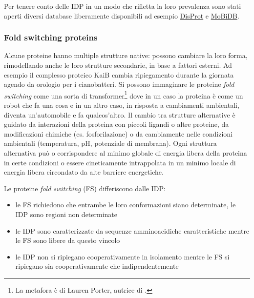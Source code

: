 {\par Per tenere conto delle IDP in un modo che rifletta la loro prevalenza sono stati aperti diversi database liberamente disponibili ad esempio \href{http://www.disprot.org}{DisProt} e \href{http://MoBiDB.bio.unipd.it}{MoBiDB}.

\subsubsection{Fold switching proteins} \label{sec:fold-switching-proteins}
{
Alcune proteine hanno multiple strutture native: possono cambiare la loro forma, rimodellando anche le loro strutture secondarie, in base a fattori esterni. Ad esempio il complesso proteico KaiB cambia ripiegamento durante la giornata agendo da orologio per i cianobatteri. Si possono immaginare le proteine \textit{fold switching} come una sorta di transformer\footnote{La metafora è di Lauren Porter\supercite{porterYT}, autrice di .} dove in un caso la proteina è come un robot che fa una cosa e in un altro caso, in risposta a cambiamenti ambientali, diventa un'automobile e fa qualcos'altro. Il cambio tra strutture alternative è guidato da interazioni della proteina con piccoli ligandi o altre proteine, da modificazioni chimiche (es. fosforilazione) o da cambiamente nelle condizioni ambientali (temperatura, pH, potenziale di membrana). Ogni struttura alternativa può o corrispondere al minimo globale di energia libera della proteina in certe condizioni o essere cineticamente intrappolata in un minimo locale di energia libera\supercite{varela2019kinetic} circondato da alte barriere energetiche.

\par Le proteine \textit{fold switching} (FS) differiscono dalle IDP\supercite{porter2018extant}: 

\begin{itemize}
	\item le FS richiedono che entrambe le loro conformazioni siano determinate, le IDP sono regioni non determinate
	\item le IDP sono caratterizzate da sequenze amminoacidiche caratteristiche mentre le FS sono libere da questo vincolo
	\item le IDP non si ripiegano cooperativamente in isolamento mentre le FS si ripiegano sia cooperativamente che indipendentemente
\end{itemize}

}}
